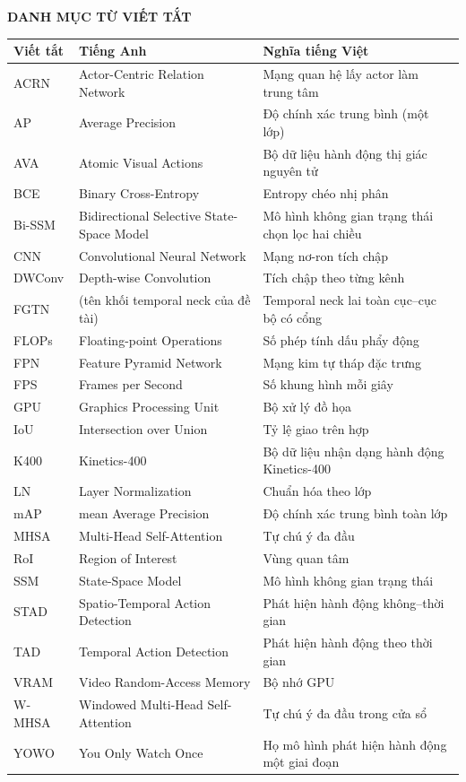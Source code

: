 \newpage
{}
{}
\begin{center}
  {\bfseries DANH MỤC TỪ VIẾT TẮT}
\end{center}

\begin{longtable}{@{}>{\raggedright\arraybackslash}p{2.4cm}>{\raggedright\arraybackslash}p{6.0cm}>{\raggedright\arraybackslash}p{6.0cm}@{}}
\toprule
\textbf{Viết tắt} & \textbf{Tiếng Anh} & \textbf{Nghĩa tiếng Việt}\\
\midrule
\endhead
ACRN & Actor-Centric Relation Network & Mạng quan hệ lấy actor làm trung tâm\\
AP & Average Precision & Độ chính xác trung bình (một lớp)\\
AVA & Atomic Visual Actions & Bộ dữ liệu hành động thị giác nguyên tử\\
BCE & Binary Cross-Entropy & Entropy chéo nhị phân\\
Bi-SSM & Bidirectional Selective State-Space Model & Mô hình không gian trạng thái chọn lọc hai chiều\\
CNN & Convolutional Neural Network & Mạng nơ-ron tích chập\\
DWConv & Depth-wise Convolution & Tích chập theo từng kênh\\
FGTN & (tên khối temporal neck của đề tài) & Temporal neck lai toàn cục--cục bộ có cổng\\
FLOPs & Floating-point Operations & Số phép tính dấu phẩy động\\
FPN & Feature Pyramid Network & Mạng kim tự tháp đặc trưng\\
FPS & Frames per Second & Số khung hình mỗi giây\\
GPU & Graphics Processing Unit & Bộ xử lý đồ họa\\
IoU & Intersection over Union & Tỷ lệ giao trên hợp\\
K400 & Kinetics-400 & Bộ dữ liệu nhận dạng hành động Kinetics-400\\
LN & Layer Normalization & Chuẩn hóa theo lớp\\
mAP & mean Average Precision & Độ chính xác trung bình toàn lớp\\
MHSA & Multi-Head Self-Attention & Tự chú ý đa đầu\\
RoI & Region of Interest & Vùng quan tâm\\
SSM & State-Space Model & Mô hình không gian trạng thái\\
STAD & Spatio-Temporal Action Detection & Phát hiện hành động không--thời gian\\
TAD & Temporal Action Detection & Phát hiện hành động theo thời gian\\
VRAM & Video Random-Access Memory & Bộ nhớ GPU\\
W-MHSA & Windowed Multi-Head Self-Attention & Tự chú ý đa đầu trong cửa sổ\\
YOWO & You Only Watch Once & Họ mô hình phát hiện hành động một giai đoạn\\
\bottomrule
\end{longtable}
\clearpage
